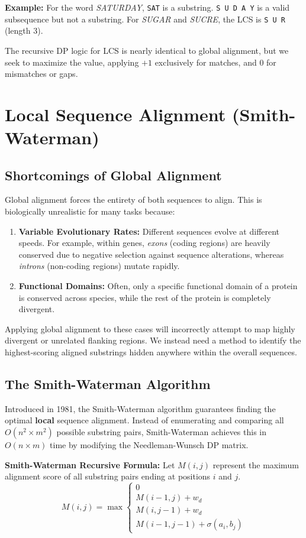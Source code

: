 \documentclass[11pt, a4paper]{article}
\newenvironment{important}
  {\begin{tcolorbox}[colback=blue!5!white, colframe=blue!75!black, arc=1mm, boxrule=1pt]}
  {\end{tcolorbox}}
\begin{document}
\textbf{Example:} For the word \textit{SATURDAY}, \texttt{SAT} is a substring. \texttt{S U D A Y} is a valid subsequence but not a substring. For \textit{SUGAR} and \textit{SUCRE}, the LCS is \texttt{S U R} (length 3).

The recursive DP logic for LCS is nearly identical to global alignment, but we seek to maximize the value, applying $+1$ exclusively for matches, and $0$ for mismatches or gaps.

\section{Local Sequence Alignment (Smith-Waterman)}

\subsection{Shortcomings of Global Alignment}
Global alignment forces the entirety of both sequences to align. This is biologically unrealistic for many tasks because:
\begin{enumerate}
    \item \textbf{Variable Evolutionary Rates:} Different sequences evolve at different speeds. For example, within genes, \textit{exons} (coding regions) are heavily conserved due to negative selection against sequence alterations, whereas \textit{introns} (non-coding regions) mutate rapidly.
    \item \textbf{Functional Domains:} Often, only a specific functional domain of a protein is conserved across species, while the rest of the protein is completely divergent.
\end{enumerate}
Applying global alignment to these cases will incorrectly attempt to map highly divergent or unrelated flanking regions. We instead need a method to identify the highest-scoring aligned substrings hidden anywhere within the overall sequences.

\subsection{The Smith-Waterman Algorithm}
Introduced in 1981, the Smith-Waterman algorithm guarantees finding the optimal \textbf{local} sequence alignment. Instead of enumerating and comparing all $O(n^2 \times m^2)$ possible substring pairs, Smith-Waterman achieves this in $O(n \times m)$ time by modifying the Needleman-Wunsch DP matrix.

\begin{important}
  \textbf{Smith-Waterman Recursive Formula:}
  Let $M(i,j)$ represent the maximum alignment score of all substring pairs ending at positions $i$ and $j$.
  \[
  M(i, j) = \max \begin{cases} 
      0 \\
      M(i-1, j) + w_d \\
      M(i, j-1) + w_d \\
      M(i-1, j-1) + \sigma(a_i, b_j) 
   \end{cases}
  \]
\end{important}
\end{document}
